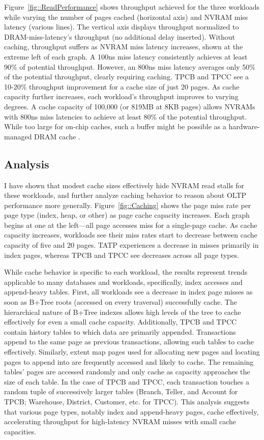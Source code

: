 Figure~\ref{fig::ReadPerformance} shows throughput achieved for the three workloads while varying the number of pages cached (horizontal axis) and NVRAM miss latency (various lines).
The vertical axis displays throughput normalized to DRAM-miss-latency's throughput (no additional delay inserted).
Without caching, throughput suffers as NVRAM miss latency increases, shown at the extreme left of each graph.
A 100ns miss latency consistently achieves at least 90\% of potential throughput.
However, an 800ns miss latency averages only 50\% of the potential throughput, clearly requiring caching.
TPCB and TPCC see a 10-20\% throughput improvement for a cache size of just 20 pages.
As cache capacity further increases, each workload's throughput improves to varying degrees.
A cache capacity of 100,000 (or 819MB at 8KB pages) allows NVRAMs with 800ns miss latencies to achieve at least 80\% of the potential throughput.
While too large for on-chip caches, such a buffer might be possible as a hardware-managed DRAM cache \cite{QureshiSrinivasan09}.

\subsection{Analysis}
\label{sec:OLTP_eval:Reads:Analysis}

I have shown that modest cache sizes effectively hide NVRAM read stalls for these workloads, and further analyze caching behavior to reason about OLTP performance more generally.
Figure~\ref{fig::Caching} shows the page miss rate per page type (index, heap, or other) as page cache capacity increases.
Each graph begins at one at the left---all page accesses miss for a single-page cache.
As cache capacity increases, workloads see their miss rates start to decrease between cache capacity of five and 20 pages.
TATP experiences a decrease in misses primarily in index pages, whereas TPCB and TPCC see decreases across all page types.

While cache behavior is specific to each workload, the results represent trends applicable to many databases and workloads, specifically, index accesses and append-heavy tables.
First, all workloads see a decrease in index page misses as soon as B+Tree roots (accessed on every traversal) successfully cache.
The hierarchical nature of B+Tree indexes allows high levels of the tree to cache effectively for even a small cache capacity.
Additionally, TPCB and TPCC contain history tables to which data are primarily appended.
Transactions append to the same page as previous transactions, allowing such tables to cache effectively.
Similarly, extent map pages used for allocating new pages and locating pages to append into are frequently accessed and likely to cache.
The remaining tables' pages are accessed randomly and only cache as capacity approaches the size of each table.
In the case of TPCB and TPCC, each transaction touches a random tuple of successively larger tables (Branch, Teller, and Account for TPCB; Warehouse, District, Customer, etc. for TPCC).
This analysis suggests that various page types, notably index and append-heavy pages, cache effectively, accelerating throughput for high-latency NVRAM misses with small cache capacities.

